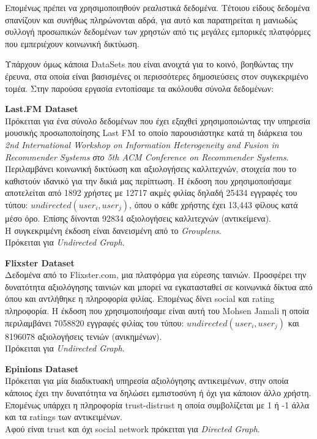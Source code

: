 Επομένως πρέπει να χρησιμοποιηθούν ρεαλιστικά δεδομένα.
Τέτοιου είδους δεδομένα σπανίζουν και συνήθως πληρώνονται αδρά, για αυτό και παρατηρείται η μανιωδώς 
συλλογή προσωπικών δεδομένων των χρηστών από τις μεγάλες εμπορικές πλατφόρμες που εμπεριέχουν κοινωνική δικτύωση.

Υπάρχουν όμως κάποια DataSets που είναι ανοιχτά για το κοινό, βοηθώντας την έρευνα, 
στα οποία είναι βασισμένες οι περισσότερες δημοσιεύσεις στον συγκεκριμένο τομέα.
Στην παρούσα εργασία εντοπίσαμε τα ακόλουθα σύνολα δεδομένων:

\begin{description}
\item \textbf{Last.FM Dataset}  \hfill \\
Πρόκειται για ένα σύνολο δεδομένων που έχει εξαχθεί χρησιμοποιώντας την υπηρεσία μουσικής προσωποποίησης Last FM\cite{LastFM} το οποίο παρουσιάστηκε κατά τη διάρκεια του 
\emph{2nd International Workshop on Information Heterogeneity and Fusion in Recommender Systems στο 5th ACM Conference on Recommender Systems}\cite{RecSys2011}.\\
Περιλαμβάνει κοινωνική δικτύωση και αξιολογήσεις καλλιτεχνών, στοιχεία που το καθιστούν ιδανικό για την δικιά μας περίπτωση.
Η έκδοση που χρησιμοποιήσαμε αποτελείται από 1892 χρήστες με 12717 ακμές φιλίας δηλαδή 25434 εγγραφές του τύπου: $undirected (user_i, user_j)$, 
όπου ο κάθε χρήστης έχει 13,443 φίλους κατά μέσο όρο.
Επίσης δίνονται 92834 αξιολογήσεις καλλιτεχνών (αντικείμενα).\\
Η συγκεκριμένη έκδοση είναι δανεισμένη από το \emph{Grouplens}\cite{grouplens}.\\
Πρόκειται για \emph{Undirected Graph}.
\item \textbf{Flixster Dataset}  \hfill \\
Δεδομένα από το Flixster.com\cite{flixster}, μια πλατφόρμα για εύρεσης ταινιών. Προσφέρει την δυνατότητα αξιολόγησης ταινιών και μπορεί να εγκατασταθεί σε κοινωνικά δίκτυα
από όπου και αντλήθηκε η πληροφορία φιλίας. Επομένως δίνει social και rating πληροφορία. 
Η έκδοση που χρησιμοποιήσαμε είναι αυτή του Mohsen Jamali\cite{MohsenJamali} η οποία περιλαμβάνει 7058820 εγγραφές φιλίας του τύπου: $undirected (user_i, user_j)$ και
8196078 αξιολογήσεις τενιών (ανικημένων).\\
Πρόκειται για \emph{Undirected Graph}.
\item \textbf{Epinions Dataset}  \hfill \\
Πρόκειται για μία διαδικτυακή υπηρεσία αξιολόγησης αντικειμένων, στην οποία κάποιος έχει την δυνατότητα να δηλώσει εμπιστοσύνη ή όχι για κάποιον άλλο χρήστη. 
Επομένως υπάρχει η πληροφορία trust-distrust η οποία συμβολίζεται με 1 ή -1 άλλα και τα ratings των αντικειμένων.\\
Αφού είναι trust και όχι social network πρόκειται για \emph{Directed Graph}. \cite{massa2006trust}
\end{description} 

